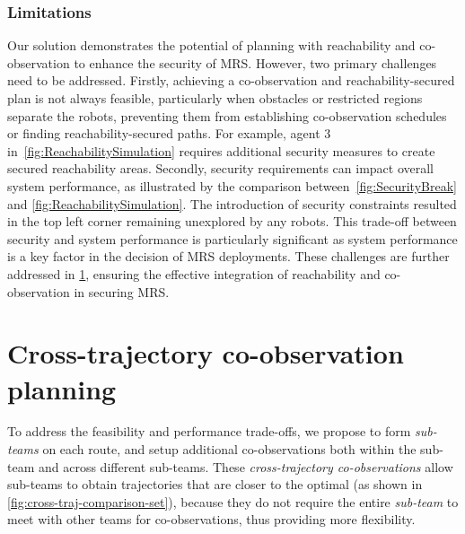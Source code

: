 \documentclass[10pt,twocolumn,twoside]{IEEEtran}
\begin{document}
\subsubsection{Limitations}\label{sec:reachability-discussion}
Our solution demonstrates the potential of planning with reachability and co-observation to enhance the security of MRS. However, two primary challenges need to be addressed. Firstly, achieving a co-observation and reachability-secured plan is not always feasible, particularly when obstacles or restricted regions separate the robots, preventing them from establishing co-observation schedules or finding reachability-secured paths. For example, agent 3 in~\cref{fig:ReachabilitySimulation} requires additional security measures to create secured reachability areas. Secondly, security requirements can impact overall system performance, as illustrated by the comparison between~\cref{fig:SecurityBreak} and \cref{fig:ReachabilitySimulation}. The introduction of security constraints resulted in the top left corner remaining unexplored by any robots. This trade-off between security and system performance is particularly significant as system performance is a key factor in the decision of MRS deployments. These challenges are further addressed in \cref{sec:cross-trajectory}, ensuring the effective integration of reachability and co-observation in securing MRS.

\section{Cross-trajectory co-observation planning}\label{sec:cross-trajectory}
To address the feasibility and performance trade-offs, we propose to form \emph{sub-teams} on each route, and setup additional co-observations both within the sub-team and across different sub-teams. These \emph{cross-trajectory co-observations} allow sub-teams to obtain trajectories that are closer to the optimal (as shown in \cref{fig:cross-traj-comparison-set}), because they do not require the entire \emph{sub-team} to meet with other teams for co-observations, thus providing more flexibility.
\end{document}
